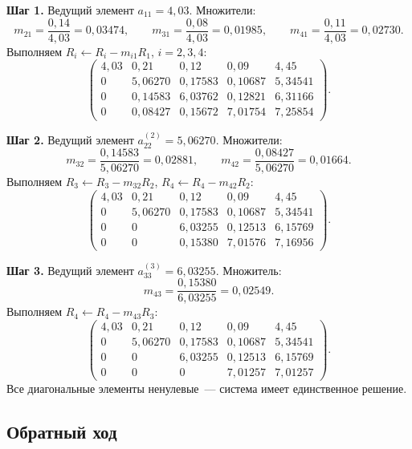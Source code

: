 \documentclass[a4paper, final]{article}
\begin{document}
\textbf{Шаг 1.} Ведущий элемент $a_{11} = 4{,}03$. Множители:
\[
m_{21} = \frac{0{,}14}{4{,}03} = 0{,}03474,\qquad
m_{31} = \frac{0{,}08}{4{,}03} = 0{,}01985,\qquad
m_{41} = \frac{0{,}11}{4{,}03} = 0{,}02730.
\]
Выполняем $R_i \leftarrow R_i - m_{i1} R_1$, $i = 2,3,4$:
\[
\left(\begin{array}{cccc|c}
4{,}03 & 0{,}21      & 0{,}12      & 0{,}09      & 4{,}45      \\
0      & 5{,}06270   & 0{,}17583   & 0{,}10687   & 5{,}34541   \\
0      & 0{,}14583   & 6{,}03762   & 0{,}12821   & 6{,}31166   \\
0      & 0{,}08427   & 0{,}15672   & 7{,}01754   & 7{,}25854
\end{array}\right).
\]

\textbf{Шаг 2.} Ведущий элемент $a_{22}^{(2)} = 5{,}06270$. Множители:
\[
m_{32} = \frac{0{,}14583}{5{,}06270} = 0{,}02881,\qquad
m_{42} = \frac{0{,}08427}{5{,}06270} = 0{,}01664.
\]
Выполняем $R_3 \leftarrow R_3 - m_{32} R_2$, $R_4 \leftarrow R_4 - m_{42} R_2$:
\[
\left(\begin{array}{cccc|c}
4{,}03 & 0{,}21    & 0{,}12      & 0{,}09      & 4{,}45      \\
0      & 5{,}06270 & 0{,}17583   & 0{,}10687   & 5{,}34541   \\
0      & 0         & 6{,}03255   & 0{,}12513   & 6{,}15769   \\
0      & 0         & 0{,}15380   & 7{,}01576   & 7{,}16956
\end{array}\right).
\]

\textbf{Шаг 3.} Ведущий элемент $a_{33}^{(3)} = 6{,}03255$. Множитель:
\[
m_{43} = \frac{0{,}15380}{6{,}03255} = 0{,}02549.
\]
Выполняем $R_4 \leftarrow R_4 - m_{43} R_3$:
\[
\left(\begin{array}{cccc|c}
4{,}03 & 0{,}21    & 0{,}12      & 0{,}09      & 4{,}45      \\
0      & 5{,}06270 & 0{,}17583   & 0{,}10687   & 5{,}34541   \\
0      & 0         & 6{,}03255   & 0{,}12513   & 6{,}15769   \\
0      & 0         & 0           & 7{,}01257   & 7{,}01257
\end{array}\right).
\]
Все диагональные элементы ненулевые~--- система имеет единственное решение.

\subsection{Обратный ход}
\end{document}
